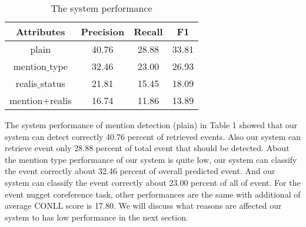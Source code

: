\documentclass[11pt]{article}
\begin{document}
\begin{table}

\begin{tabular}{ | c| c| c| c| } 
\hline
Attributes& Precision & Recall & F1 \\ 
\hline
plain & 40.76 &28.88 & 33.81 \\ 
mention$\_$type & 32.46 &23.00 & 26.93 \\ 
realis$\_$status & 21.81 & 15.45 & 18.09 \\
mention+realis & 16.74 & 11.86 & 13.89\\

\hline

\end{tabular}
\caption {The system performance}
\label{perf}
\end{table}


The system performance of mention detection (plain) in Table 1 showed that our system can detect correctly 40.76 percent of retrieved events. Also our system can retrieve event only 28.88 percent of total event that should be detected. About the mention type performance of our system is quite low, our system can classify the event correctly about 32.46 percent of overall predicted event. And our system can classify the event correctly about 23.00 percent of all of event. For the event nugget coreference task, other performances are the same with additional of average CONLL score is 17.80. We will discuss what reasons are affected our system to has low performance in the next section.
\end{document}
